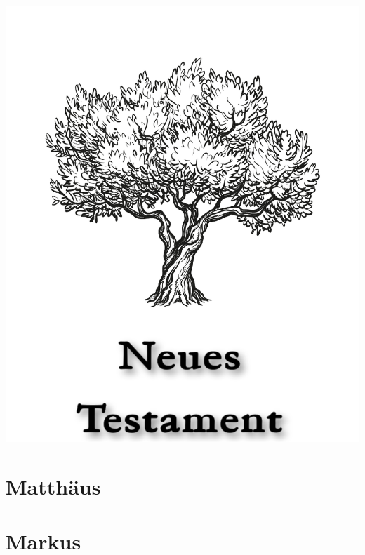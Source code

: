 \null\vfill
\begin{center}
\begin{minipage}[c]{\textwidth}
  \begin{center}
  \includegraphics{NeuesTestamentTitel.pdf}
  \end{center}
\end{minipage}
\end{center}
\null\vfill
\newpage

\pagestyle{bible}

\chapter{Matthäus}
\begin{multicols}{2}
  \raggedcolumns
  \parskip=0pt \relax
  
\end{multicols}

\chapter{Markus}
\begin{multicols}{2}
  \raggedcolumns
  \parskip=0pt \relax
  
\end{multicols}

